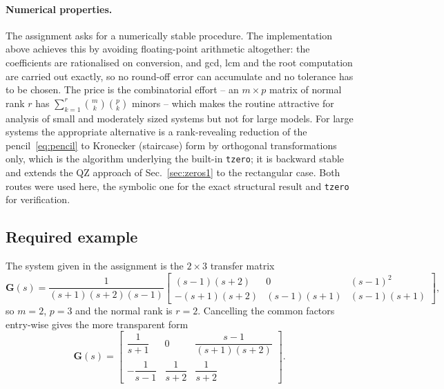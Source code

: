 \paragraph{Numerical properties.} The assignment asks for a numerically stable procedure. The
implementation above achieves this by avoiding floating-point arithmetic altogether: the
coefficients are rationalised on conversion, and gcd, lcm and the root computation are carried
out exactly, so no round-off error can accumulate and no tolerance has to be chosen. The price
is the combinatorial effort -- an $m\times p$ matrix of normal rank $r$ has
$\sum_{k=1}^{r}\binom{m}{k}\binom{p}{k}$ minors -- which makes the routine attractive for
analysis of small and moderately sized systems but not for large models. For large systems the
appropriate alternative is a rank-revealing reduction of the pencil~\eqref{eq:pencil} to
Kronecker (staircase) form by orthogonal transformations only, which is the algorithm
underlying the built-in \texttt{tzero}; it is backward stable and extends the QZ approach of
Sec.~\ref{sec:zeros1} to the rectangular case. Both routes were used here, the symbolic one for
the exact structural result and \texttt{tzero} for verification.

\subsection{Required example}

The system given in the assignment is the $2\times3$ transfer matrix
\begin{equation}
    \mathbf{G}(s) = \frac{1}{(s+1)(s+2)(s-1)}
    \begin{bmatrix}
        (s-1)(s+2) & 0 & (s-1)^2\\
        -(s+1)(s+2) & (s-1)(s+1) & (s-1)(s+1)
    \end{bmatrix},
    \label{eq:ex212}
\end{equation}
so $m=2$, $p=3$ and the normal rank is $r=2$. Cancelling the common factors entry-wise gives the
more transparent form
\begin{equation}
    \mathbf{G}(s) =
    \begin{bmatrix}
        \dfrac{1}{s+1} & 0 & \dfrac{s-1}{(s+1)(s+2)}\\[10pt]
        -\dfrac{1}{s-1} & \dfrac{1}{s+2} & \dfrac{1}{s+2}
    \end{bmatrix}.
    \label{eq:ex212simple}
\end{equation}

